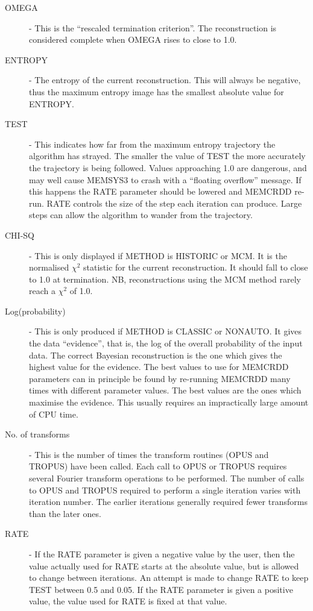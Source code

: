 \begin {description}
\item [OMEGA] - This is the ``rescaled termination criterion''. The 
reconstruction is considered complete when OMEGA rises to close to 1.0.
\item [ENTROPY] - The entropy of the current reconstruction. This will always 
be negative, thus the maximum entropy image has the smallest 
absolute value for ENTROPY.

\item [TEST] - This indicates how far from the maximum entropy trajectory the 
algorithm has strayed. The smaller the value of TEST the more accurately the 
trajectory is being followed. Values approaching 1.0 are dangerous, and may
well  cause MEMSYS3 to crash with a ``floating overflow'' message. If this
happens the  RATE parameter should be lowered and MEMCRDD re-run. RATE controls
the size of  the step each iteration can produce. Large steps can allow the
algorithm to  wander from the trajectory.

\item [CHI-SQ] - This is only displayed if METHOD is HISTORIC or MCM. It is the 
normalised $\chi^{2}$ statistic for the current reconstruction. It should fall 
to close to 1.0 at termination. NB, reconstructions using the MCM method
rarely reach a $\chi^{2}$ of 1.0.
\item [Log(probability)] - This is only produced if METHOD is CLASSIC or 
NONAUTO. It gives the data ``evidence'', that is, the log of the overall 
probability of the 
input data. The correct Bayesian reconstruction is the one which gives the 
highest value for the evidence. The best values to use for MEMCRDD parameters 
can in principle be found by re-running MEMCRDD many times with different 
parameter values. The best values are the ones which maximise the evidence. 
This usually requires an impractically large amount of CPU time.

\item [No. of transforms] - This is the number of times the transform routines 
(OPUS and TROPUS) have been called. Each call to OPUS or TROPUS requires
several  Fourier transform operations to be performed. The number of calls to
OPUS and  TROPUS required to perform a single iteration varies with iteration
number.  The earlier iterations generally required fewer transforms than the
later ones.

\item [RATE] - If the RATE parameter is given a negative value by the user,
then  the value actually used for RATE starts at the absolute value, but is
allowed to  change between iterations. An attempt is made to change RATE to
keep TEST  between 0.5 and 0.05. If the RATE parameter is given a positive
value, the value used for RATE is fixed at that value.

\end {description}

